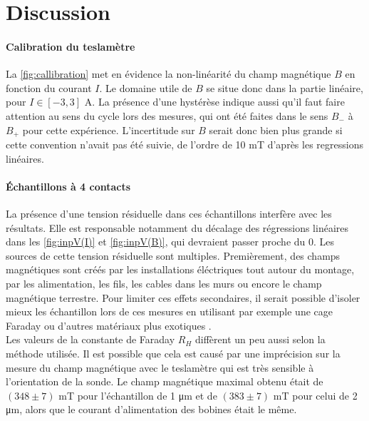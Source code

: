 \section{Discussion}

\paragraph*{Calibration du teslamètre}
La \autoref{fig:callibration} met en évidence la non-linéarité du champ magnétique \(B\) en fonction du courant \(I\). Le domaine utile de \(B\) se situe donc dans la partie linéaire, pour \(I \in [-3, 3]\) \si{\ampere}. La présence d'une hystérèse indique aussi qu'il faut faire attention au sens du cycle lors des mesures, qui ont été faites dans le sens \(B_-\) à \(B_+\) pour cette expérience. L'incertitude sur \(B\) serait donc bien plus grande si cette convention n'avait pas été suivie, de l'ordre de 10 \si{\milli\tesla} d'après les regressions linéaires.

\paragraph*{Échantillons à 4 contacts}
La présence d'une tension résiduelle dans ces échantillons interfère avec les résultats. Elle est responsable notamment du décalage des régressions linéaires dans les \autoref{fig:inpV(I)} et \autoref{fig:inpV(B)}, qui devraient passer proche du 0. Les sources de cette tension résiduelle sont multiples. Premièrement, des champs magnétiques sont créés par les installations éléctriques tout autour du montage, par les alimentation, les fils, les cables dans les murs ou encore le champ magnétique terrestre. Pour limiter ces effets secondaires, il serait possible d'isoler mieux les échantillon lors de ces mesures en utilisant par exemple une cage Faraday ou d'autres matériaux plus exotiques \cite{em_shielding}.\\
Les valeurs de la constante de Faraday \(R_H\) diffèrent un peu aussi selon la méthode utilisée. Il est possible que cela est causé par une imprécision sur la mesure du champ magnétique avec le teslamètre qui est très sensible à l'orientation de la sonde. Le champ magnétique maximal obtenu était de \((348 \pm 7)\) \si{\milli\tesla} pour l'échantillon de 1 \si{\micro\meter} et de \((383 \pm 7)\) \si{\milli\tesla} pour celui de 2 \si{\micro\meter}, alors que le courant d'alimentation des bobines était le même.
